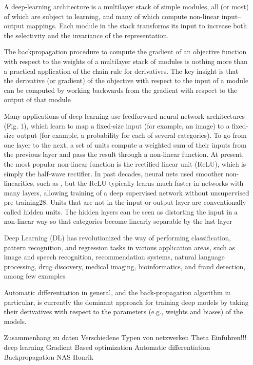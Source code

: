 A deep-learning architecture is a multilayer stack of simple modules, all (or most) of which are subject to learning, and many of which compute non-linear input–output mappings. Each module in the stack transforms its input to increase both the selectivity and the invariance of the representation.

The backpropagation procedure to compute the gradient of an objective function with respect to the weights of a multilayer stack of modules is nothing more than a practical application of the chain rule for derivatives. The key insight is that the derivative (or gradient) of the objective with respect to the input of a module can be computed by working backwards from the gradient with respect to the output of that module

Many applications of deep learning use feedforward neural network architectures (Fig. 1), which learn to map a fixed-size input (for example, an image) to a fixed-size output (for example, a probability for each of several categories). To go from one layer to the next, a set of units compute a weighted sum of their inputs from the previous layer and pass the result through a non-linear function. At present, the most popular non-linear function is the rectified linear unit (ReLU), which is simply the half-wave rectifier. In past decades, neural nets used smoother non-linearities, such as , but the ReLU typically learns much faster in networks with many layers, allowing training of a deep supervised network without unsupervised pre-training28. Units that are not in the input or output layer are conventionally called hidden units. The hidden layers can be seen as distorting the input in a non-linear way so that categories become linearly separable by the last layer 

Deep Learning (DL) has revolutionized the way of performing classification, pattern recognition, and regression
tasks in various application areas, such as image and speech recognition, recommendation systems, natural language
processing, drug discovery, medical imaging, bioinformatics, and fraud detection, among few examples

Automatic differentiation in general, and the back-propagation algorithm in particular, is currently the dominant approach for training deep models by taking their derivatives with respect to the parameters (e.g., weights and biases) of the models.


Zusammenhang zu daten
Verschiedene Typen von netzwerken
Theta Einführen!!!
deep learning
Gradient Based optimization
Automatic differentiation
Backpropagation 
NAS
Honrik 
